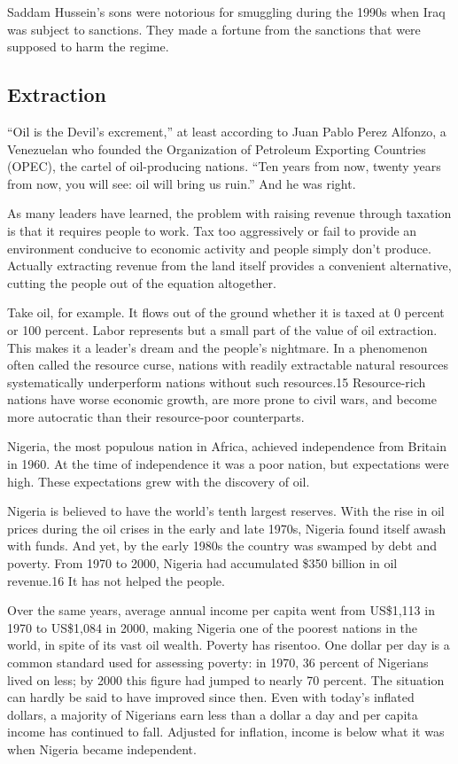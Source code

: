 \documentclass[10pt]{article}
\begin{document}
{\large Saddam Hussein's sons were notorious for smuggling during the 1990s when
Iraq was subject to sanctions. They made a fortune from the sanctions that were
supposed to harm the regime.}

\subsection{Extraction}

{\large ``Oil is the Devil's excrement,'' at least according to Juan Pablo Perez
Alfonzo, a Venezuelan who founded the Organization of Petroleum Exporting
Countries (OPEC), the cartel of oil-producing nations. ``Ten years from now,
twenty years from now, you will see: oil will bring us ruin.'' And he was right.}

{\large As many leaders have learned, the problem with raising revenue through
taxation is that it requires people to work. Tax too aggressively or fail to
provide an environment conducive to economic activity and people simply don't
produce. Actually extracting revenue from the land itself provides a convenient
alternative, cutting the people out of the equation altogether.}

{\large Take oil, for example. It flows out of the ground whether it is taxed at
0 percent or 100 percent. Labor represents but a small part of the value of oil
extraction. This makes it a leader's dream and the people's nightmare. In a
phenomenon often called the resource curse, nations with readily extractable
natural resources systematically underperform nations without such resources.15
Resource-rich nations have worse economic growth, are more prone to civil wars,
and become more autocratic than their resource-poor counterparts.}

{\large Nigeria, the most populous nation in Africa, achieved independence from
Britain in 1960. At the time of independence it was a poor nation, but
expectations were high. These expectations grew with the discovery of oil.}

{\large Nigeria is believed to have the world's tenth largest reserves. With the
rise in oil prices during the oil crises in the early and late 1970s, Nigeria
found itself awash with funds. And yet, by the early 1980s the country was
swamped by debt and poverty. From 1970 to 2000, Nigeria had accumulated \$350
billion in oil revenue.16 It has not helped the people.}

{\large Over the same years, average annual income per capita went from
US\$1,113 in 1970 to US\$1,084 in 2000, making Nigeria one of the poorest nations
in the world, in spite of its vast oil wealth. Poverty has risentoo. One dollar
per day is a common standard used for assessing poverty: in 1970, 36 percent of
Nigerians lived on less; by 2000 this figure had jumped to nearly 70 percent. The
situation can hardly be said to have improved since then. Even with today's
inflated dollars, a majority of Nigerians earn less than a dollar a day and per
capita income has continued to fall. Adjusted for inflation, income is below what
it was when Nigeria became independent.}
\end{document}
